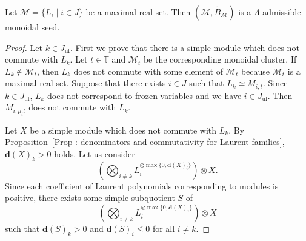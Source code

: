 \begin{Thm}
\label{Thm : Lambda admissibility of maximal real sets}
Let $\mathcal{M} = \{L_i \mid i \in J\}$ be a maximal real set.
Then $(\mathcal{M}, \widetilde{B}_{\mathcal{M}})$ is a
$\Lambda$-admissible monoidal seed.
\end{Thm}

\begin{proof}
Let $k \in J_{\mathrm{uf}}$.
First we prove that there is a simple module which does not commute
with $L_k$.
Let $t \in \mathbb{T}$ and $\mathcal{M}_t$ be the corresponding
monoidal cluster.
If $L_k \notin \mathcal{M}_t$, then $L_k$ does not commute with
some element of $\mathcal{M}_t$ because $\mathcal{M}_t$ is a
maximal real set.
Suppose that there exists $i \in J$ such that $L_k \simeq M_{i;t}$.
Since $k \in J_{\mathrm{uf}}$, $L_k$ does not correspond to
frozen variables and we have $i \in J_{\mathrm{uf}}$.
Then $M_{i; \mu_i t}$ does not commute with $L_k$. 

Let $X$ be a simple module which does not commute with $L_k$.
By Proposition~\ref{Prop : denominators and commutativity for Laurent families},
$\mathbf{d}(X)_k > 0$ holds.
Let us consider
\[
\left(\bigotimes_{i \neq k}
L_i^{\otimes\max\{0, \mathbf{d}(X)_i\}}\right) \otimes X.
\]
Since each coefficient of Laurent polynomials corresponding to modules
is positive, there exists some simple subquotient $S$ of
\[
\left(\bigotimes_{i \neq k}
L_i^{\otimes\max\{0, \mathbf{d}(X)_i\}}\right) \otimes X
\]
such that $\mathbf{d}(S)_k > 0$ and $\mathbf{d}(S)_i \leq 0$
for all $i \neq k$.


\end{proof}
